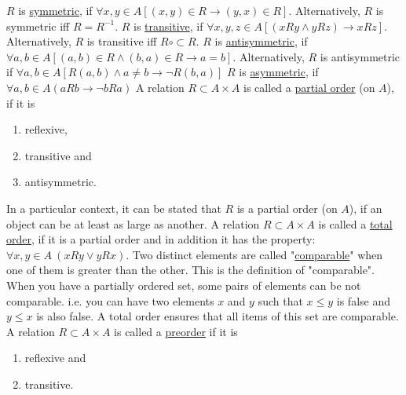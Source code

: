 \documentclass[12pt]{article}
\begin{document}
\begin{flushleft}
	\textbullet \quad $R$ is \uline{symmetric}, if $\displaystyle \forall x, y \in A \left[ (x,y) \in R \rightarrow(y,x) \in R \right]$. Alternatively, $R$ is symmetric iff $R= R^{-1}$. \linebreak 
	\textbullet \quad $R$ is \uline{transitive}, if $\displaystyle \forall x,y,z \in A \left[ (xRy \land yRz) \rightarrow  xRz \right]$. Alternatively, $R$ is transitive iff $R\circ \subset R$. \linebreak 
	\textbullet \quad $R$ is \uline{antisymmetric}, if $\displaystyle \forall a, b \in A \left[ (a,b) \in R \land (b,a) \in R \rightarrow a = b \right]$. Alternatively, $R$ is antisymmetric if $\displaystyle \forall a,b \in A \left[ R(a,b) \land a\neq b \rightarrow \lnot R(b,a) \right] $ \linebreak 
	\textbullet \quad $R$ is \uline{asymmetric}, if $\displaystyle \forall a, b \in A (aRb \rightarrow \lnot bRa ) $ \linebreak 
	\textbullet \quad A relation $\displaystyle R\subset A \times A$ is called a \uline{partial order} (on $A$), if it is  
	\begin{enumerate}
	\item reflexive, 
	\item transitive and 
	\item antisymmetric.  
	\end{enumerate} 
	In a particular context, it can be stated that $R$ is a partial order (on $A$), if an object can be at least as large as another. \linebreak 
	\textbullet \quad A relation $\displaystyle R\subset A \times A$ is called a \uline{total order}, if it is a partial order and in addition it has the property: $\displaystyle \forall x,y \in A \ (xRy \lor yRx)$. \linebreak 
	\textbullet \quad Two distinct elements are called "\uline{comparable}" when one of them is greater than the other. This is the definition of "comparable". When you have a partially ordered set, some pairs of elements can be not comparable. i.e. you can have two elements $x$ and $y$ such that $x\leq y$ is false and $y\leq x$ is also false. A total order ensures that all items of this set are comparable. \linebreak 
	\textbullet \quad A relation $\displaystyle R \subset A \times A$ is called a \uline{preorder} if it is  
	\begin{enumerate}
	\item reflexive and 
	\item transitive.  

\end{enumerate}
\end{flushleft}
\end{document}
